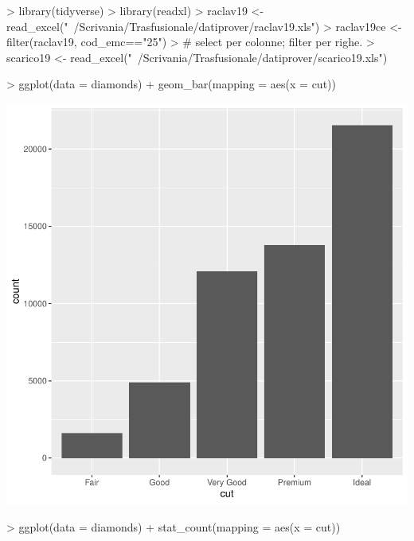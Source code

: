 \documentclass{article}
\begin{document}


\begin{Schunk}
\begin{Sinput}
> library(tidyverse)
> library(readxl)
>     raclav19 <- read_excel("~/Scrivania/Trasfusionale/datiprover/raclav19.xls")
> raclav19ce <- filter(raclav19, cod_emc=="25")
> # select per colonne; filter per righe. 
> scarico19 <- read_excel("~/Scrivania/Trasfusionale/datiprover/scarico19.xls")
\end{Sinput}
\end{Schunk}
\begin{Schunk}
\begin{Sinput}
> ggplot(data = diamonds) + geom_bar(mapping = aes(x = cut))
\end{Sinput}
\end{Schunk}
\includegraphics{tidigg-002}
\begin{Schunk}
\begin{Sinput}
> ggplot(data = diamonds) + stat_count(mapping = aes(x = cut))
\end{Sinput}
\end{Schunk}
\end{document}

